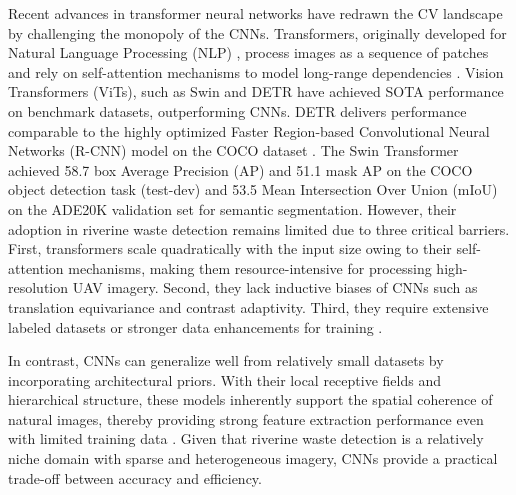 \documentclass{ieeeaccess}
\begin{document}
Recent advances in transformer neural networks have redrawn the CV landscape by challenging the monopoly of the CNNs. Transformers, originally developed for Natural Language Processing (NLP) \cite{Vaswani2017AttentionIA}, process images as a sequence of patches and rely on self-attention mechanisms to model long-range dependencies \cite{Dosovitskiy2020AnII}. Vision Transformers (ViTs), such as Swin \cite{Liu2021SwinTH} and DETR \cite{Zhu2020DeformableDD} have achieved SOTA performance on benchmark datasets, outperforming CNNs. DETR delivers performance comparable to the highly optimized Faster Region-based Convolutional Neural Networks (R-CNN) model on the COCO dataset \cite{Carion2020EndtoEndOD}. The Swin Transformer achieved 58.7 box Average Precision (AP) and 51.1 mask AP on the COCO object detection task (test-dev) and 53.5 Mean Intersection Over Union (mIoU) on the ADE20K validation set for semantic segmentation. However, their adoption in riverine waste detection remains limited due to three critical barriers. First, transformers scale quadratically with the input size owing to their self-attention mechanisms, making them resource-intensive for processing high-resolution UAV imagery. Second, they lack inductive biases of CNNs such as translation equivariance and contrast adaptivity. Third, they require extensive labeled datasets or stronger data enhancements for training \cite{Touvron2020TrainingDI}.  

In contrast, CNNs can generalize well from relatively small datasets by incorporating architectural priors. With their local receptive fields and hierarchical structure, these models inherently support the spatial coherence of natural images, thereby providing strong feature extraction performance even with limited training data \cite{Zhao2018ObjectDW}. Given that riverine waste detection is a relatively niche domain with sparse and heterogeneous imagery, CNNs provide a practical trade-off between accuracy and efficiency.
\end{document}
